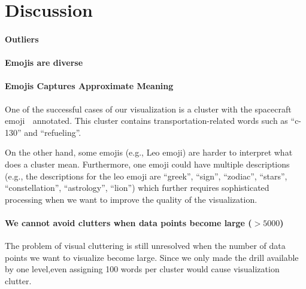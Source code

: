 \section{Discussion}
\label{sec:discussion}

\paragraph{Outliers} 

\paragraph{Emojis are diverse} 

\paragraph{\bf Emojis Captures Approximate Meaning} 
One of the successful cases of our visualization is a cluster with the spacecraft emoji 🚀 annotated. This cluster contains transportation-related words such as ``c-130'' and ``refueling''. 

On the other hand, some emojis (e.g., Leo emoji) are harder to interpret what does a cluster mean. 
Furthermore, one emoji could have multiple descriptions (e.g., the descriptions for the leo emoji are ``greek'', ``sign'', ``zodiac'', ``stars'', ``constellation'', ``astrology'', ``lion'') which further requires sophisticated processing when we want to improve the quality of the visualization. 

\paragraph{\bf We cannot avoid clutters when data points become large ($>5000$)} 
The problem of visual cluttering is still unresolved when the number of data points we want to visualize become large. 
Since we only made the drill available by one level,even assigning 100 words per cluster would cause visualization clutter. 
